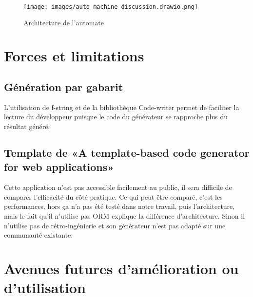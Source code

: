
\begin{figure}
\centering
\texttt{[image: images/auto\_machine\_discussion.drawio.png]}
\caption{Architecture de l'automate}
\label{fig:dia_auto_machine_discussion}
\end{figure}

\section{Forces et limitations}

\subsection{Génération par gabarit}

L’utilisation de f-string et de la bibliothèque Code-writer permet de faciliter la lecture du développeur puisque le code du générateur se rapproche plus du résultat généré.

\subsection{Template de «A template-based code generator for web applications»}
Cette application n’est pas accessible facilement au public, il sera difficile de comparer l’efficacité du côté pratique. Ce qui peut être comparé, c’est les performances, hors ça n’a pas été testé dans notre travail, puis l’architecture, mais le fait qu’il n’utilise pas ORM explique la différence d’architecture. Sinon il n’utilise pas de rétro-ingénierie et son générateur n’est pas adapté sur une communauté existante.

\section{Avenues futures d’amélioration ou d’utilisation}

